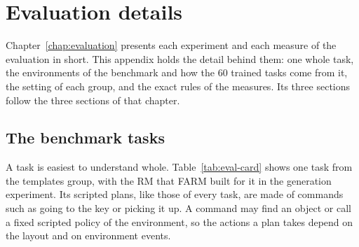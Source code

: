 \documentclass[11pt,english,listoffigures,listoftables]{tfgetsinf}
\begin{document}
\chapter{Evaluation details}
\label{app:eval-details}
Chapter~\ref{chap:evaluation} presents each experiment and each measure of the evaluation in short. This appendix holds the detail behind them: one whole task, the environments of the benchmark and how the 60 trained tasks come from it, the setting of each group, and the exact rules of the measures. Its three sections follow the three sections of that chapter.

\section{The benchmark tasks}
\label{app:eval-cards}
A task is easiest to understand whole. Table~\ref{tab:eval-card} shows one task from the templates group, with the RM that FARM built for it in the generation experiment. Its scripted plans, like those of every task, are made of commands such as going to the key or picking it up. A command may find an object or call a fixed scripted policy of the environment, so the actions a plan takes depend on the layout and on environment events.
\end{document}
